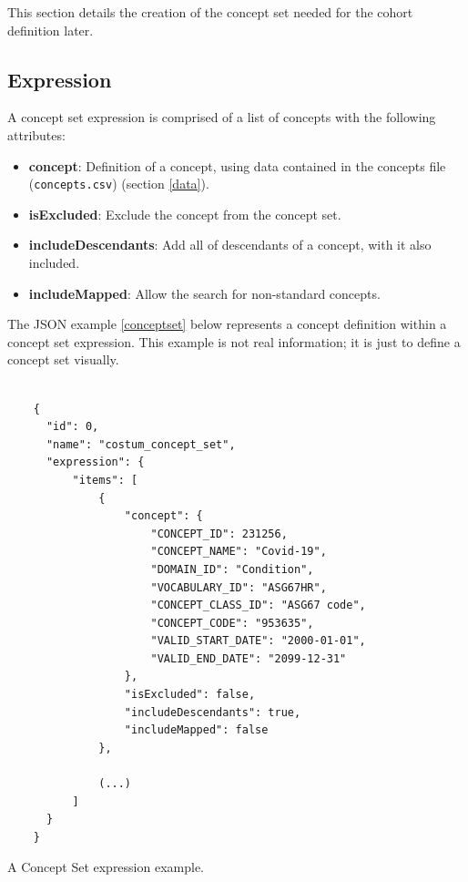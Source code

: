 This section details the creation of the concept set needed for the cohort definition later.


\subsection{Expression}
A concept set expression is comprised of a list of concepts with the following attributes:

\begin{itemize}
  \item \textbf{concept}: Definition of a concept, using data contained in the concepts file  {\small\normalfont(\texttt{concepts.csv})} (section \ref{data}).
  \item \textbf{isExcluded}: Exclude the concept from the concept set.
  \item \textbf{includeDescendants}: Add all of descendants of a concept, with it also included.
  \item \textbf{includeMapped}: Allow the search for non-standard concepts.
\end{itemize}


The JSON example \ref{conceptset} below represents a concept definition within a concept set expression. This example is not real information; it is just to define a concept set visually.

\begin{listing}[H]
  \begin{verbatim}
      
    {
      "id": 0,
      "name": "costum_concept_set",
      "expression": {
          "items": [
              {
                  "concept": {
                      "CONCEPT_ID": 231256,
                      "CONCEPT_NAME": "Covid-19",
                      "DOMAIN_ID": "Condition",
                      "VOCABULARY_ID": "ASG67HR",
                      "CONCEPT_CLASS_ID": "ASG67 code",
                      "CONCEPT_CODE": "953635",
                      "VALID_START_DATE": "2000-01-01",
                      "VALID_END_DATE": "2099-12-31"
                  },
                  "isExcluded": false,
                  "includeDescendants": true,
                  "includeMapped": false
              },
              
              (...)
          ]
      }
    }

  \end{verbatim}
\caption{A Concept Set expression example.}
\label{conceptset}
\end{listing}  



